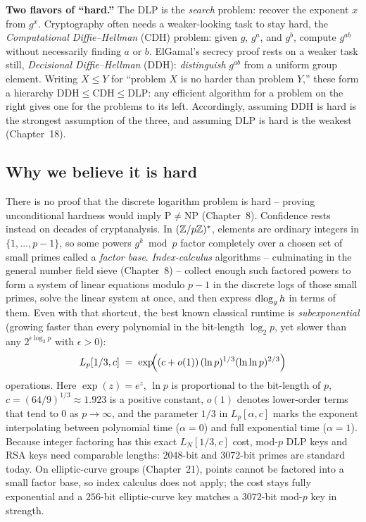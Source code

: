 \begin{focusbox}
\textbf{Two flavors of ``hard.''} The DLP is the \emph{search} problem: recover the exponent $x$ from $g^x$.
Cryptography often needs a weaker-looking task to stay hard, the \emph{Computational
Diffie--Hellman} (CDH) problem: given $g$, $g^a$, and $g^b$, compute $g^{ab}$ without necessarily
finding $a$ or $b$. ElGamal's secrecy proof rests on a weaker task still, \emph{Decisional
Diffie--Hellman} (DDH): \emph{distinguish} $g^{ab}$ from a uniform group element. Writing $X \le Y$ for ``problem $X$ is no harder than problem $Y$,'' these form a hierarchy $\text{DDH} \le \text{CDH} \le \text{DLP}$: any efficient algorithm for a problem on the right gives one for the problems to its left. Accordingly, assuming DDH is hard is the strongest assumption of the three, and assuming DLP is hard is the weakest (Chapter~18).
\end{focusbox}

\subsection{Why we believe it is hard}

There is no proof that the discrete logarithm problem is hard -- proving unconditional hardness would imply $\mathrm{P} \ne \mathrm{NP}$ (Chapter~8). Confidence rests instead on decades
of cryptanalysis. In $(\mathbb{Z}/p\mathbb{Z})^{*}$, elements are ordinary integers in $\{1, \dots, p-1\}$, so some powers $g^k \bmod p$ factor completely over a chosen set of small primes called a \emph{factor base}. \emph{Index-calculus} algorithms -- culminating in the general number field sieve (Chapter~8) -- collect enough such factored powers to form a system of linear equations modulo $p-1$ in the discrete logs of those small primes, solve the linear system at once, and then express $\operatorname{dlog}_g h$ in terms of them. Even with that shortcut, the best known classical runtime is \emph{subexponential} (growing faster than every polynomial in the bit-length $\log_2 p$, yet slower than any $2^{\epsilon \log_2 p}$ with $\epsilon > 0$):
\[
  L_p[1/3, c] \;=\; \exp\!\Bigl( (c+o(1))\,(\ln p)^{1/3} (\ln\ln p)^{2/3} \Bigr)
\]
operations. Here $\exp(z) = e^z$, $\ln p$ is proportional to the bit-length of $p$, $c = (64/9)^{1/3} \approx 1.923$ is a positive constant, $o(1)$ denotes lower-order terms that tend to $0$ as $p \to \infty$, and the parameter $1/3$ in $L_p[\alpha, c]$ marks the exponent interpolating between polynomial time ($\alpha = 0$) and full exponential time ($\alpha = 1$). Because integer factoring has this exact $L_N[1/3, c]$ cost, mod-$p$ DLP keys and RSA keys need comparable lengths: $2048$-bit and $3072$-bit primes are standard today. On elliptic-curve groups (Chapter~21), points cannot be factored into a small factor base, so index calculus does not apply; the cost stays fully exponential and a $256$-bit elliptic-curve key matches a $3072$-bit mod-$p$ key in strength.

